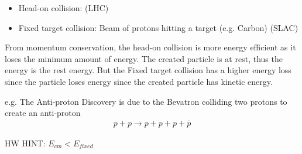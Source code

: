 \documentclass[../main.tex]{subfiles}
\begin{document}
\begin{itemize}
    \item Head-on collision: (LHC)
    \item Fixed target collision: Beam of protons hitting a target (e.g. Carbon) (SLAC)
\end{itemize}  
From momentum conservation, the head-on collision is more energy efficient as it loses the minimum
amount of energy. The created particle is at rest, thus the energy is the rest energy. But the Fixed
target collision has a higher energy loss since the particle loses energy since the created particle
has kinetic energy.

e.g. The Anti-proton Discovery is due to the Bevatron colliding two protons to create an anti-proton
\begin{align*}
    p + p \rightarrow p + p + p + \bar p
\end{align*}

HW HINT: $E_{cm} < E_{fixed}$
\end{document}
